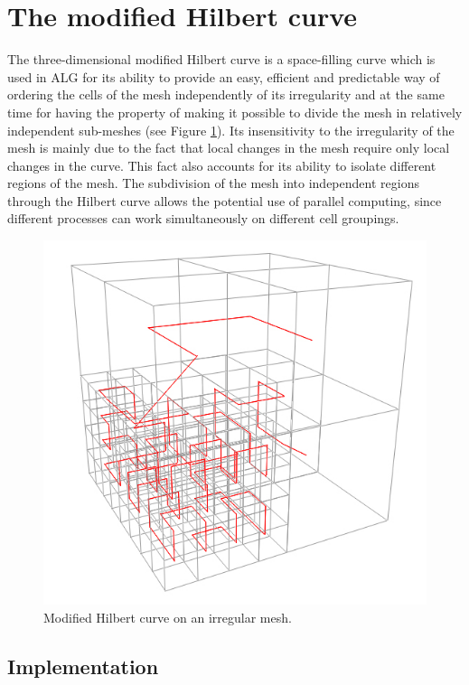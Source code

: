 \section{The modified Hilbert curve} \label{SEC_HILBERT_CURVE}

The three-dimensional modified Hilbert curve is a space-filling
curve which is used in ALG for its ability to provide an easy,
efficient and predictable way of ordering the cells of the mesh
independently of its irregularity and at the same time for having
the property of making it possible to divide the mesh in relatively
independent sub-meshes (see Figure \ref{FIG_IRREGULAR_CURVE}). Its insensitivity to the irregularity of the
mesh is mainly due to the fact that local changes in the mesh
require only local changes in the curve. This fact also accounts for
its ability to isolate different regions of the mesh. The
subdivision of the mesh into independent regions through the Hilbert
curve allows the potential use of parallel computing, since
different processes can work simultaneously on different cell
groupings.

\begin{figure}[H]
\centering
    \includegraphics[scale=0.4]{../img/irregularCurve.jpg}
    \caption{Modified Hilbert curve on an irregular mesh.}
    \label{FIG_IRREGULAR_CURVE}
\end{figure}

\subsection{Implementation} \label{SUBSEC_HILBERT_CURVE_IMPLEMENTATION}

